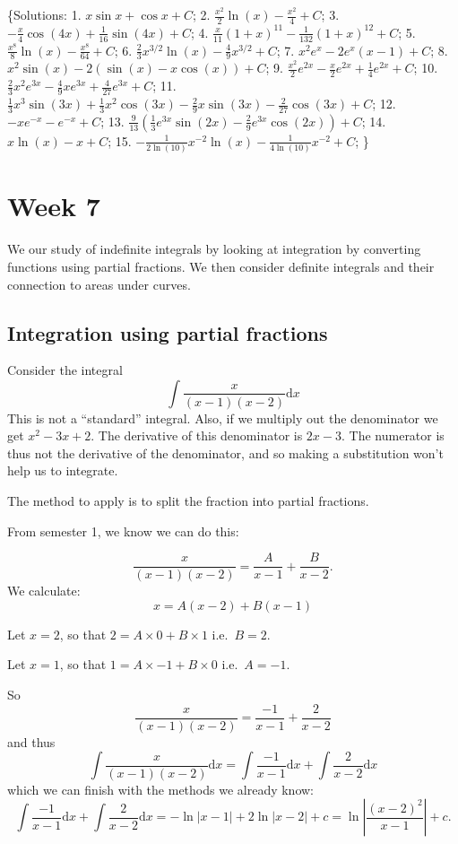 \documentclass[
  english,
  11pt,
  oneside]{book}
\newcommand{\slide}{}
\theoremstyle{definition}
\theoremstyle{definition}
\theoremstyle{definition}
\theoremstyle{definition}
\theoremstyle{remark}
\begin{document}
\{Solutions:
1. \(x\sin x+\cos x + C\);
2. \(\frac{x^2}{2}\ln(x) - \frac{x^2}{4}+C\);
3. \(-\frac{x}{4}\cos(4x)+\frac{1}{16}\sin(4x)+C\);
4. \(\frac{x}{11}(1+x)^{11} - \frac{1}{132}(1+x)^{12}+C\);
5. \(\frac{x^8}{8}\ln(x) - \frac{x^8}{64}+C\);
6. \(\frac{2}{3}x^{3/2}\ln(x) - \frac{4}{9}x^{3/2}+C\);
7. \(x^2e^x - 2e^x(x-1)+C\);
8. \(x^2\sin(x) - 2(\sin(x)-x\cos(x))+C\);
9. \(\frac{x^2}{2}e^{2x}-\frac{x}{2}e^{2x}+\frac{1}{4}e^{2x}+C\);
10. \(\frac{2}{3}x^2e^{3x}-\frac{4}{9}xe^{3x}+\frac{4}{27}e^{3x}+C\);
11. \(\frac{1}{3}x^3\sin(3x)+\frac{1}{3}x^2\cos(3x)-\frac{2}{9}x\sin(3x)-\frac{2}{27}\cos(3x)+C\);
12. \(-xe^{-x}-e^{-x}+C\);
13. \(\frac{9}{13}\left( \frac{1}{3}e^{3x}\sin(2x)-\frac{2}{9}e^{3x}\cos(2x) \right)+C\);
14. \(x\ln(x) - x +C\);
15. \(-\frac{1}{2\ln(10)}x^{-2}\ln(x) - \frac{1}{4\ln(10)}x^{-2} + C\);
\}

\chapter{Week 7}\label{week-seven}

We our study of indefinite integrals by looking at integration by converting functions using partial fractions. We then consider definite integrals and their connection to areas under curves.
\slide

\section{Integration using partial fractions}\label{integration-using-partial-fractions}

Consider the integral
\[\int\frac{x}{(x-1)(x-2)}\mathrm{d}x\]
This is not a ``standard'' integral. Also, if we multiply out the denominator we get \(x^2 - 3x + 2\). The derivative of this denominator is \(2x - 3\). The numerator is thus not the derivative of the denominator, and so making a substitution won't help us to integrate.

The method to apply is to split the fraction into partial fractions.

From semester 1, we know we can do this:

\begin{notslides}

\[\frac{x}{(x-1)(x-2)} = \frac A{x-1}+\frac B{x-2}.\]
We calculate:
\[x = A(x-2)+B(x-1)\]

Let \(x=2\), so that \(2=A\times0+B\times1\) i.e.~\(B=2\).

Let \(x=1\), so that \(1=A\times-1+B\times0\) i.e.~\(A=-1\).

So
\[\frac{x}{(x-1)(x-2)} = \frac {-1}{x-1}+\frac 2{x-2}\]
and thus
\[\int\frac{x}{(x-1)(x-2)}\mathrm{d}x = \int\frac {-1}{x-1}\mathrm{d}x+\int\frac 2{x-2}\mathrm{d}x\]
which we can finish with the methods we already know:
\[\int\frac {-1}{x-1}\mathrm{d}x+\int\frac 2{x-2}\mathrm{d}x = -\ln|x-1|+2\ln|x-2|+c = \ln\left|\frac{(x-2)^2}{x-1}\right|+c.\]

\end{notslides}
\end{document}
